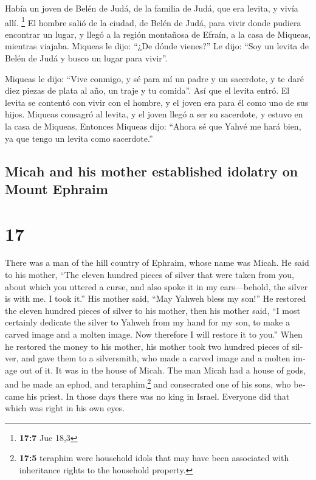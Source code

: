 \begin{paracol}{2}
 Había un joven de Belén de Judá, de la familia de Judá,
que era levita, y vivía allí. \footnote{\textbf{17:7} Jue 18,3}
 El hombre salió de la ciudad, de Belén de Judá, para
vivir donde pudiera encontrar un lugar, y llegó a la región montañosa de
Efraín, a la casa de Miqueas, mientras viajaba.  Miqueas
le dijo: ``¿De dónde vienes?'' Le dijo: ``Soy un levita de Belén de Judá
y busco un lugar para vivir''.

 Miqueas le dijo: ``Vive conmigo, y sé para mí un padre y
un sacerdote, y te daré diez piezas de plata al año, un traje y tu
comida''. Así que el levita entró.  El levita se contentó
con vivir con el hombre, y el joven era para él como uno de sus hijos.
 Miqueas consagró al levita, y el joven llegó a ser su
sacerdote, y estuvo en la casa de Miqueas.  Entonces
Miqueas dijo: ``Ahora sé que Yahvé me hará bien, ya que tengo un levita
como sacerdote.''

\switchcolumn
\begin{otherlanguage}{english}

\hypertarget{micah-and-his-mother-established-idolatry-on-mount-ephraim}{%
\subsection{Micah and his mother established idolatry on Mount
Ephraim}\label{micah-and-his-mother-established-idolatry-on-mount-ephraim}}

\hypertarget{section-33}{%
\section{17}\label{section-33}}

 There was a man of the hill country of Ephraim, whose
name was Micah.  He said to his mother, ``The eleven
hundred pieces of silver that were taken from you, about which you
uttered a curse, and also spoke it in my ears---behold, the silver is
with me. I took it.'' His mother said, ``May Yahweh bless my son!''
 He restored the eleven hundred pieces of silver to his
mother, then his mother said, ``I most certainly dedicate the silver to
Yahweh from my hand for my son, to make a carved image and a molten
image. Now therefore I will restore it to you.''  When he
restored the money to his mother, his mother took two hundred pieces of
silver, and gave them to a silversmith, who made a carved image and a
molten image out of it. It was in the house of Micah.  The
man Micah had a house of gods, and he made an ephod, and
teraphim,\footnote{\textbf{17:5} teraphim were household idols that may
  have been associated with inheritance rights to the household
  property.} and consecrated one of his sons, who became his priest.
 In those days there was no king in Israel. Everyone did
that which was right in his own eyes.


\end{otherlanguage}
\end{paracol}
